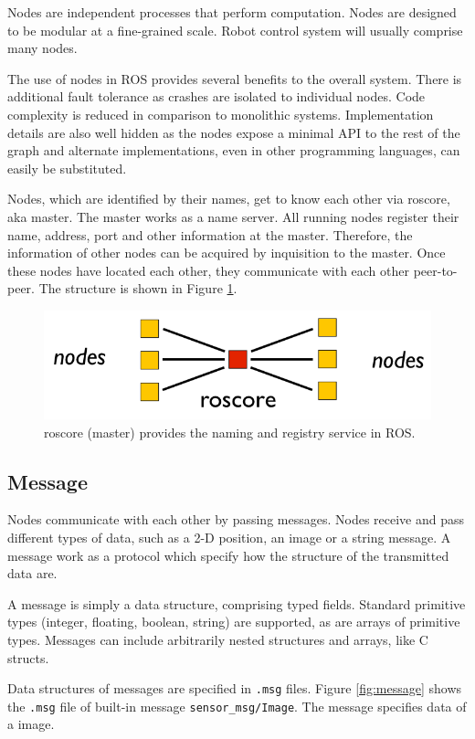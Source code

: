 \documentclass[a4paper, 10pt, conference]{ieeeconf}       %
\begin{document}
Nodes are independent processes that perform computation. Nodes are designed to be modular at a fine-grained scale. Robot control system will usually comprise many nodes.

The use of nodes in ROS provides several benefits to the overall system. There is additional fault tolerance as crashes are isolated to individual nodes. Code complexity is reduced in comparison to monolithic systems. Implementation details are also well hidden as the nodes expose a minimal API to the rest of the graph and alternate implementations, even in other programming languages, can easily be substituted. 

Nodes, which are identified by their names, get to know each other via roscore, aka master. The master works as a name server. All running nodes register their name, address, port and other information at the master. Therefore, the information of other nodes can be acquired by inquisition to the master. Once these nodes have located each other, they communicate with each other peer-to-peer. The structure is shown in Figure \ref{fig:master}.

\begin{figure}[htpb]
  \centering
  \includegraphics[width=.4\textwidth]{nodes}
  \caption{roscore (master) provides the naming and registry service in ROS.}
  \label{fig:master}
\end{figure}

\subsection{Message}

Nodes communicate with each other by passing messages. Nodes receive and pass different types of data, such as a 2-D position, an image or a string message. A message work as a protocol which specify how the structure of the transmitted data are.

A message is simply a data structure, comprising typed fields. Standard primitive types (integer, floating, boolean, string) are supported, as are arrays of primitive types. Messages can include arbitrarily nested structures and arrays, like C structs.

Data structures of messages are specified in \texttt{.msg} files. Figure \ref{fig:message} shows the \texttt{.msg} file of built-in message \texttt{sensor\_msg/Image}. The message specifies data of a image.
\end{document}
